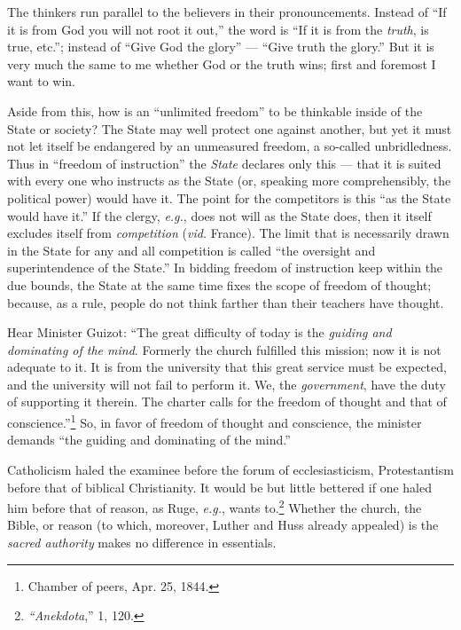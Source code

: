 The thinkers run parallel to the believers in their pronouncements. Instead of 
``If it is from God you will not root it out,'' the word is ``If it is from 
the \textit{truth}, is true, etc.''; instead of ``Give God the glory'' --- ``Give truth the glory.'' But it is very much the same to me whether God or 
the truth wins; first and foremost I want to win.

Aside from this, how is an ``unlimited freedom'' to be thinkable inside of 
the State or society? The State may well protect one against another, but yet 
it must not let itself be endangered by an unmeasured freedom, a so-called 
unbridledness. Thus in ``freedom of instruction'' the \textit{State} 
declares only this --- that it is suited with every one who instructs as the 
State (or, speaking more comprehensibly, the political power) would have it. 
The point for the competitors is this ``as the State would have it.'' If the 
clergy, \textit{e.g.}, does not will as the State does, then it itself 
excludes itself from \textit{competition} (\textit{vid.} France). The limit 
that is necessarily drawn in the State for any and all competition is called 
``the oversight and superintendence of the State.'' In bidding freedom of 
instruction keep within the due bounds, the State at the same time fixes the 
scope of freedom of thought; because, as a rule, people do not think farther 
than their teachers have thought.

Hear Minister Guizot: ``The great difficulty of today is the \textit{guiding 
and dominating of the mind}. Formerly the church fulfilled this mission; now 
it is not adequate to it. It is from the university that this great service 
must be expected, and the university will not fail to perform it. We, the 
\textit{government}, have the duty of supporting it therein. The charter calls 
for the freedom of thought and that of conscience.''\footnote{Chamber of 
peers, Apr. 25, 1844.} So, in favor of freedom of thought and conscience, the 
minister demands ``the guiding and dominating of the mind.''

Catholicism haled the examinee before the forum of ecclesiasticism, 
Protestantism before that of biblical Christianity. It would be but little 
bettered if one haled him before that of reason, as Ruge, \textit{e.g.}, 
wants to.\footnote{\textit{``Anekdota},'' 1, 120.} Whether the church, the 
Bible, or reason (to which, moreover, Luther and Huss already appealed) is the 
\textit{sacred authority} makes no difference in essentials.

